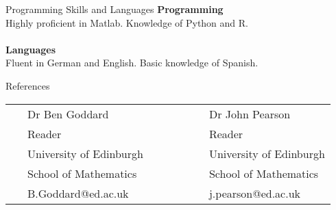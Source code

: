 \documentclass{resume} %
\begin{document}
	\begin{rSection}{Programming Skills and Languages}
		{\bf Programming}\\
		Highly proficient in Matlab. Knowledge of Python and R.\\
		\\
		{\bf Languages}\\
		Fluent in German and English. Basic knowledge of Spanish.
	\end{rSection}
\begin{rSection}{References}
	\begin{table}[h]
			\begin{tabular}{llll}
			\ &	Dr Ben Goddard & \ \ \ \ \ \ \ \ &{Dr John Pearson}\\
			\  &	Reader & \ \ \ \ \ \ \ \ &Reader \\
			\ &	University of Edinburgh & \ \ \ \ \ \ \ \ & University of Edinburgh\\
			\  &	School of Mathematics & \ \ \ \ \ \ \ \ &School of Mathematics\\
			\  &	B.Goddard@ed.ac.uk & \ \ \ \ \ \ \ \ &j.pearson@ed.ac.uk                        
			\end{tabular}
	\end{table}
 
	
\end{rSection}	
	
\end{document}
